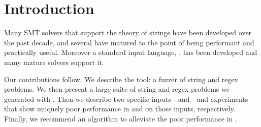 \section{Introduction}

    Many SMT solvers that support the theory of strings have been developed over the past decade, and several have matured to the point of being performant and practically useful. Moreover a standard input language, \smt{}\cite{smt}, has been developed and many mature solvers support it.

    Our contributions follow. We describe the \fuzzer{} tool: a fuzzer of \smt{} string and regex problems. We then present a large suite of \smt{} string and regex problems we generated with \fuzzer{}. Then we describe two specific inputs - \cHard{} and \zHard{} - and experiments that show uniquely poor performance in \cvc{} and \us{} on those inputs, respectively. Finally, we recommend an algorithm to alleviate the poor performance in \us{}.
